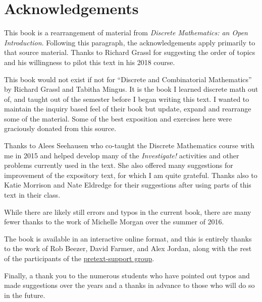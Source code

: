 \documentclass[11pt,]{book}
\theoremstyle{ptxplainnotitle}
\theoremstyle{ptxplaintitle}
\theoremstyle{ptxdefinitionnotitle}
\theoremstyle{ptxdefinitiontitle}
\theoremstyle{ptxdefinitionnotitle}
\theoremstyle{ptxdefinitiontitle}
\theoremstyle{ptxdefinitionnotitle}
\theoremstyle{ptxdefinitiontitle}
\theoremstyle{ptxdefinitiontitlenonumber}
\theoremstyle{ptxdefinitiontitlenonumber}
\numberwithin{equation}{chapter}
\begin{document}
\frontmatter


\chapter*{Acknowledgements}\label{acknowledgement-1}
\hypertarget{p-1}{}%
This book is a rearrangement of material from \textsl{Discrete Mathematics: an Open Introduction}.  Following this paragraph, the acknowledgements apply primarily to that source material. Thanks to Richard Grassl for suggesting the order of topics and his willingness to pilot this text in his 2018 course.%
\par
\hypertarget{p-2}{}%
This book would not exist if not for ``Discrete and Combinatorial Mathematics'' by Richard Grassl and Tabitha Mingus. It is the book I learned discrete math out of, and taught out of the semester before I began writing this text. I wanted to maintain the inquiry based feel of their book but update, expand and rearrange some of the material.  Some of the best exposition and exercises here were graciously donated from this source.%
\par
\hypertarget{p-3}{}%
Thanks to Alees Seehausen who co-taught the Discrete Mathematics course with me in 2015 and helped develop many of the \emph{Investigate!} activities and other problems currently used in the text. She also offered many suggestions for improvement of the expository text, for which I am quite grateful. Thanks also to Katie Morrison and Nate Eldredge for their suggestions after using parts of this text in their class.%
\par
\hypertarget{p-4}{}%
While there are likely still errors and typos in the current book, there are many fewer thanks to the work of Michelle Morgan over the summer of 2016.%
\par
\hypertarget{p-5}{}%
The book is available in an interactive online format, and this is entirely thanks to the work of Rob Beezer, David Farmer, and Alex Jordan, along with the rest of the participants of the \href{https://groups.google.com/forum/\#!forum/pretext-support}{pretext-support group}.%
\par
\hypertarget{p-6}{}%
Finally, a thank you to the numerous students who have pointed out typos and made suggestions over the years and a thanks in advance to those who will do so in the future.%
\end{document}
